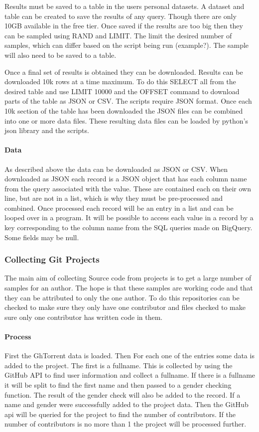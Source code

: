 \documentclass{article}
\begin{document}
Results must be saved to a table in the users personal datasets. A dataset and table can be created to save the results of any query. Though there are only 10GB available in the free tier. Once saved if the results are too big then they can be sampled using RAND and LIMIT. The limit the desired number of samples, which can differ based on the script being run (example?). The sample will also need to be saved to a table.

Once a final set of results is obtained they can be downloaded. Results can be downloaded 10k rows at a time maximum. To do this SELECT all from the desired table and use LIMIT 10000 and the OFFSET command to download parts of the table as JSON or CSV. The scripts require JSON format. Once each 10k section of the table has been downloaded the JSON files can be combined into one or more data files. These resulting data files can be loaded by python's json library and the scripts.

\paragraph{Data}
As described above the data can be downloaded as JSON or CSV. When downloaded as JSON each record is a JSON object that has each column name from the query associated with the value. These are contained each on their own line, but are not in a list, which is why they must be pre-processed and combined. Once processed each record will be an entry in a list and can be looped over in a program. It will be possible to access each value in a record by a key corresponding to the column name from the SQL queries made on BigQuery. Some fields may be null.

\subsubsection{Collecting Git Projects}
The main aim of collecting Source code from projects is to get a large number of samples for an author. The hope is that these samples are working code and that they can be attributed to only the one author. To do this repositories can be checked to make sure they only have one contributor and files checked to make sure only one contributor has written code in them.

\paragraph{Process}
First the GhTorrent data is loaded. Then For each one of the entries some data is added to the project. The first is a fullname. This is collected by using the GitHub API to find user information and collect a fullname. If there is a fullname it will be split to find the first name and then passed to a gender checking function. The result of the gender check will also be added to the record. If a name and gender were successfully added to the project data. Then the GitHub api will be queried for the project to find the number of contributors. If the number of contributors is no more than 1 the project will be processed further.
\end{document}

